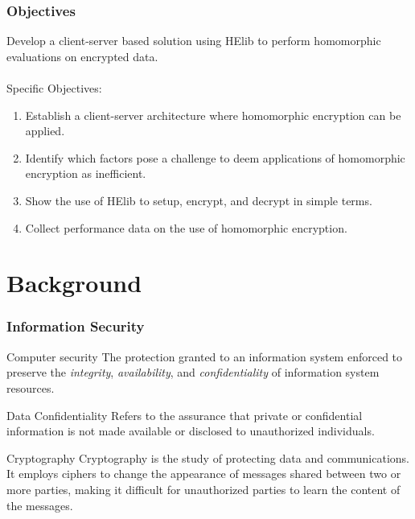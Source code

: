 \documentclass{beamer}
\begin{document}
\begin{frame}
\frametitle{Objectives}

Develop a client-server based solution using HElib to perform homomorphic evaluations on encrypted data. \\~\\

Specific Objectives:\\
\begin{enumerate}
  \setlength\itemsep{1em}
\item Establish a client-server architecture where homomorphic encryption can be applied.
\item Identify which factors pose a challenge to deem applications of homomorphic encryption as inefficient.
\item Show the use of HElib to setup, encrypt, and decrypt in simple terms.
\item Collect performance data on the use of homomorphic encryption.
\end{enumerate}


\end{frame}

\section{Background}
\begin{frame}
\frametitle{Information Security}

\begin{block}{Computer security \cite{NIST95}}
The protection granted to an information system enforced to preserve the \emph{integrity}, \emph{availability}, and \emph{confidentiality} of information system resources.
\end{block}

\begin{block}{Data Confidentiality \cite{CryptoStallings}}
Refers to the assurance that private or confidential information is not made available or disclosed to unauthorized individuals.
\end{block}

\begin{block}{Cryptography \cite{IntroCryptoMath}}
Cryptography is the study of protecting data and communications. It employs ciphers to change the appearance of messages shared between two or more parties, making it difficult for unauthorized parties to learn the content of the messages.
\end{block}

\end{frame}
\end{document}
